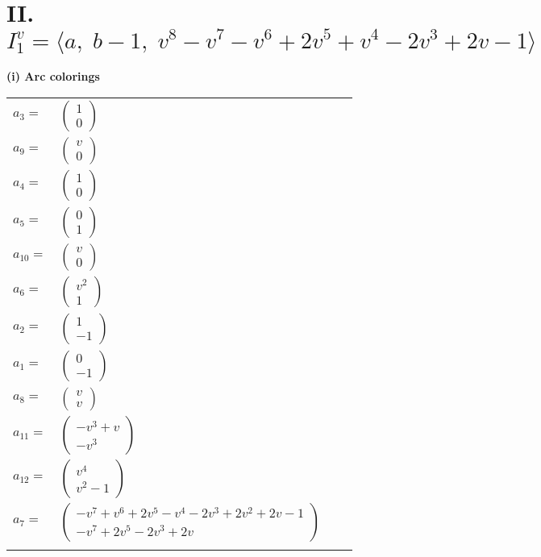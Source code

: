 \documentclass[1p]{elsarticle_modified}
\theoremstyle{definition}
\begin{document}
\centering \section*{II. $I^v_{1}= \langle a,\;b-1,\;v^8- v^7- v^6+2 v^5+v^4-2 v^3+2 v-1 \rangle$}
\flushleft \textbf{(i) Arc colorings}\\
\begin{tabular}{m{7pt} m{180pt} m{7pt} m{180pt} }
\flushright $a_{3}=$&$\begin{pmatrix}1\\0\end{pmatrix}$ \\
\flushright $a_{9}=$&$\begin{pmatrix}v\\0\end{pmatrix}$ \\
\flushright $a_{4}=$&$\begin{pmatrix}1\\0\end{pmatrix}$ \\
\flushright $a_{5}=$&$\begin{pmatrix}0\\1\end{pmatrix}$ \\
\flushright $a_{10}=$&$\begin{pmatrix}v\\0\end{pmatrix}$ \\
\flushright $a_{6}=$&$\begin{pmatrix}v^2\\1\end{pmatrix}$ \\
\flushright $a_{2}=$&$\begin{pmatrix}1\\-1\end{pmatrix}$ \\
\flushright $a_{1}=$&$\begin{pmatrix}0\\-1\end{pmatrix}$ \\
\flushright $a_{8}=$&$\begin{pmatrix}v\\v\end{pmatrix}$ \\
\flushright $a_{11}=$&$\begin{pmatrix}- v^3+v\\- v^3\end{pmatrix}$ \\
\flushright $a_{12}=$&$\begin{pmatrix}v^4\\v^2-1\end{pmatrix}$ \\
\flushright $a_{7}=$&$\begin{pmatrix}- v^7+v^6+2 v^5- v^4-2 v^3+2 v^2+2 v-1\\- v^7+2 v^5-2 v^3+2 v\end{pmatrix}$\\&\end{tabular}
\end{document}
